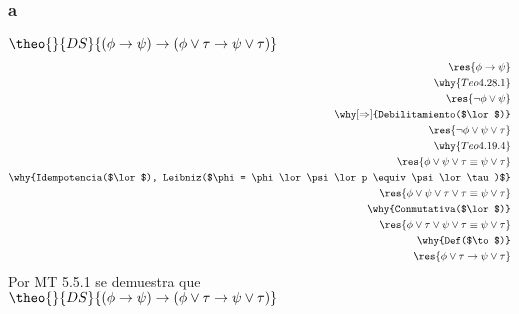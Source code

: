 \documentclass[twoside]{article}
\begin{document}
\subsubsection{a}
\begin{logicenv}{$\theo{}{DS}{(\phi \to \psi) \to (\phi \lor \tau \to \psi \lor \tau)}$}
    \begin{align*}
            \res{\phi \to \psi}\\
        \why{Teo 4.28.1}\\
            \res{\neg\phi \lor \psi}\\
        \why[\Rightarrow]{Debilitamiento($\lor$)}\\
            \res{\neg\phi \lor \psi \lor \tau}\\
        \why{Teo 4.19.4}\\
            \res{\phi \lor \psi  \lor \tau \equiv \psi \lor \tau}\\
        \why{Idempotencia($\lor$), Leibniz($\phi = \phi \lor \psi \lor p \equiv \psi \lor \tau)$}\\
            \res{\phi \lor \psi \lor \tau \lor \tau \equiv \psi \lor \tau}\\
        \why{Conmutativa($\lor$)}\\
            \res{\phi \lor \tau \lor \psi \lor \tau \equiv \psi \lor \tau}\\
        \why{Def($\to$)}\\
            \res{\phi \lor \tau \to \psi \lor \tau}
    \end{align*}
    Por MT 5.5.1 se demuestra que\\
    $\theo{}{DS}{(\phi \to \psi) \to (\phi \lor \tau \to \psi \lor \tau)}$
\end{logicenv}
\end{document}
